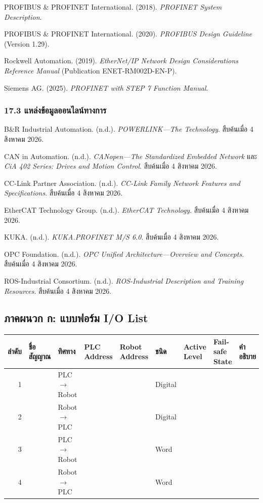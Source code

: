 PROFIBUS \& PROFINET International. (2018). \textit{PROFINET System Description}.

PROFIBUS \& PROFINET International. (2020). \textit{PROFIBUS Design Guideline} (Version 1.29).

Rockwell Automation. (2019). \textit{EtherNet/IP Network Design Considerations Reference Manual} (Publication ENET-RM002D-EN-P).

Siemens AG. (2025). \textit{PROFINET with STEP 7 Function Manual}.

\subsubsection{17.3 แหล่งข้อมูลออนไลน์ทางการ}

B\&R Industrial Automation. (n.d.). \textit{POWERLINK—The Technology}. สืบค้นเมื่อ 4 สิงหาคม 2026.

CAN in Automation. (n.d.). \textit{CANopen—The Standardized Embedded Network} และ \textit{CiA 402 Series: Drives and Motion Control}. สืบค้นเมื่อ 4 สิงหาคม 2026.

CC-Link Partner Association. (n.d.). \textit{CC-Link Family Network Features and Specifications}. สืบค้นเมื่อ 4 สิงหาคม 2026.

EtherCAT Technology Group. (n.d.). \textit{EtherCAT Technology}. สืบค้นเมื่อ 4 สิงหาคม 2026.

KUKA. (n.d.). \textit{KUKA.PROFINET M/S 6.0}. สืบค้นเมื่อ 4 สิงหาคม 2026.

OPC Foundation. (n.d.). \textit{OPC Unified Architecture—Overview and Concepts}. สืบค้นเมื่อ 4 สิงหาคม 2026.

ROS-Industrial Consortium. (n.d.). \textit{ROS-Industrial Description and Training Resources}. สืบค้นเมื่อ 4 สิงหาคม 2026.



\subsection{ภาคผนวก ก: แบบฟอร์ม I/O List}

\begin{table}[htbp]
    \centering
    \begin{tabular}{r l l l l l l l l}
        \hline
        \textbf{ลำดับ} & \textbf{ชื่อสัญญาณ} & \textbf{ทิศทาง} & \textbf{PLC Address} & \textbf{Robot Address} & \textbf{ชนิด} & \textbf{Active Level} & \textbf{Fail-safe State} & \textbf{คำอธิบาย} \\
        \hline
        1 &  & PLC \(\to\) Robot &  &  & Digital &  &  &  \\
        2 &  & Robot \(\to\) PLC &  &  & Digital &  &  &  \\
        3 &  & PLC \(\to\) Robot &  &  & Word &  &  &  \\
        4 &  & Robot \(\to\) PLC &  &  & Word &  &  &  \\
        \hline
    \end{tabular}
\end{table}

